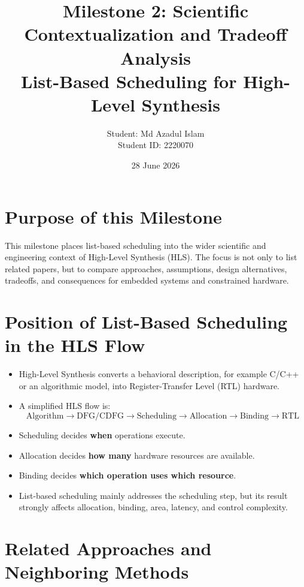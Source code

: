 \documentclass[11pt,a4paper]{article}
\title{Milestone 2: Scientific Contextualization and Tradeoff Analysis\\
\large List-Based Scheduling for High-Level Synthesis}
\author{Student: Md Azadul Islam\\Student ID: 2220070}
\date{28 June 2026}
\begin{document}
\maketitle

\section*{Purpose of this Milestone}

This milestone places list-based scheduling into the wider scientific and engineering context of High-Level Synthesis (HLS).
The focus is not only to list related papers, but to compare approaches, assumptions, design alternatives, tradeoffs, and consequences for embedded systems and constrained hardware.

\section{Position of List-Based Scheduling in the HLS Flow}

\begin{itemize}[leftmargin=*]
    \item High-Level Synthesis converts a behavioral description, for example C/C++ or an algorithmic model, into Register-Transfer Level (RTL) hardware.
    \item A simplified HLS flow is:
    \[
    \text{Algorithm} \rightarrow \text{DFG/CDFG} \rightarrow \text{Scheduling} \rightarrow \text{Allocation} \rightarrow \text{Binding} \rightarrow \text{RTL}
    \]
    \item Scheduling decides \textbf{when} operations execute.
    \item Allocation decides \textbf{how many} hardware resources are available.
    \item Binding decides \textbf{which operation uses which resource}.
    \item List-based scheduling mainly addresses the scheduling step, but its result strongly affects allocation, binding, area, latency, and control complexity.
\end{itemize}

\section{Related Approaches and Neighboring Methods}
\end{document}

